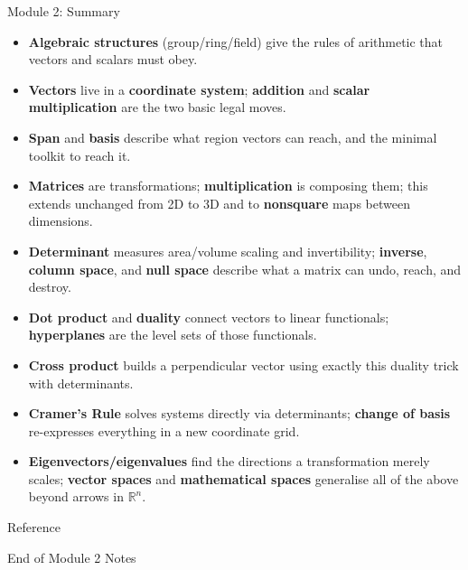 \documentclass[9pt,aspectratio=169]{beamer}
\begin{document}
\begin{frame}{Module 2: Summary}
\small
\begin{itemize}
\item \textbf{Algebraic structures} (group/ring/field) give the rules of arithmetic that
vectors and scalars must obey.
\item \textbf{Vectors} live in a \textbf{coordinate system}; \textbf{addition} and
\textbf{scalar multiplication} are the two basic legal moves.
\item \textbf{Span} and \textbf{basis} describe what region vectors can reach, and the
minimal toolkit to reach it.
\item \textbf{Matrices} are transformations; \textbf{multiplication} is composing them;
this extends unchanged from 2D to 3D and to \textbf{nonsquare} maps between dimensions.
\item \textbf{Determinant} measures area/volume scaling and invertibility; \textbf{inverse},
\textbf{column space}, and \textbf{null space} describe what a matrix can undo, reach, and
destroy.
\item \textbf{Dot product} and \textbf{duality} connect vectors to linear functionals;
\textbf{hyperplanes} are the level sets of those functionals.
\item \textbf{Cross product} builds a perpendicular vector using exactly this duality
trick with determinants.
\item \textbf{Cramer's Rule} solves systems directly via determinants; \textbf{change of
basis} re-expresses everything in a new coordinate grid.
\item \textbf{Eigenvectors/eigenvalues} find the directions a transformation merely
scales; \textbf{vector spaces} and \textbf{mathematical spaces} generalise all of the above
beyond arrows in $\mathbb{R}^n$.
\end{itemize}
\end{frame}

\begin{frame}{Reference}

\centering
\Large End of Module 2 Notes
\end{frame}
\end{document}
